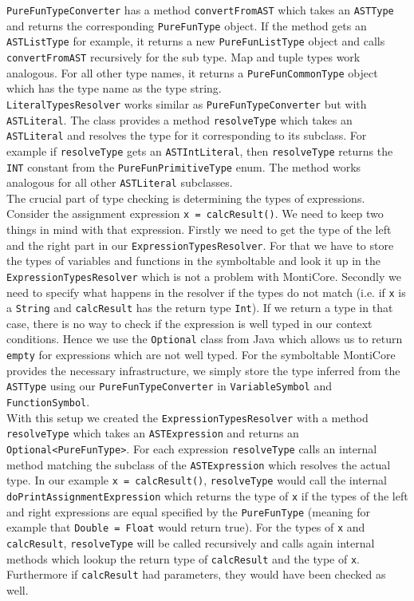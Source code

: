 \texttt{PureFunTypeConverter} has a method \texttt{convertFromAST} which takes an \texttt{ASTType} and returns the corresponding \texttt{PureFunType} object. If the method gets an \texttt{ASTListType} for example, it returns a new \texttt{PureFunListType} object and calls \texttt{convertFromAST} recursively for the sub type. Map and tuple types work analogous. For all other type names, it returns a \texttt{PureFunCommonType} object which has the type name as the type string.\\
\texttt{LiteralTypesResolver} works similar as \texttt{PureFunTypeConverter} but with \texttt{ASTLiteral}. The class provides a method \texttt{resolveType} which takes an \texttt{ASTLiteral} and resolves the type for it corresponding to its subclass. For example if \texttt{resolveType} gets an \texttt{ASTIntLiteral}, then \texttt{resolveType} returns the \texttt{INT} constant from the \texttt{PureFunPrimitiveType} enum. The method works analogous for all other \texttt{ASTLiteral} subclasses.\\
The crucial part of type checking is determining the types of expressions. Consider the assignment expression \texttt{x = calcResult()}. We need to keep two things in mind with that expression. Firstly we need to get the type of the left and the right part in our \texttt{ExpressionTypesResolver}. For that we have to store the types of variables and functions in the symboltable and look it up in the \texttt{ExpressionTypesResolver} which is not a problem with MontiCore. Secondly we need to specify what happens in the resolver if the types do not match (i.e. if \texttt{x} is a \texttt{String} and \texttt{calcResult} has the return type \texttt{Int}). If we return a type in that case, there is no way to check if the expression is well typed in our context conditions. Hence we use the \texttt{Optional} class from Java which allows us to return \texttt{empty} for expressions which are not well typed. For the symboltable MontiCore provides the necessary infrastructure, we simply store the type inferred from the \texttt{ASTType} using our \texttt{PureFunTypeConverter} in \texttt{VariableSymbol} and \texttt{FunctionSymbol}.\\
With this setup we created the \texttt{ExpressionTypesResolver} with a method \texttt{resolveType} which takes an \texttt{ASTExpression} and returns an \texttt{Optional<PureFunType>}. For each expression \texttt{resolveType} calls an internal method matching the subclass of the \texttt{ASTExpression} which resolves the actual type. In our example \texttt{x = calcResult()}, \texttt{resolveType} would call the internal \texttt{doPrintAssignmentExpression} which returns the type of \texttt{x} if the types of the left and right expressions are equal specified by the \texttt{PureFunType} (meaning for example that \texttt{Double = Float} would return true). For the types of \texttt{x} and \texttt{calcResult}, \texttt{resolveType} will be called recursively and calls again internal methods which lookup the return type of \texttt{calcResult} and the type of \texttt{x}. Furthermore if \texttt{calcResult} had parameters, they would have been checked as well.\\
